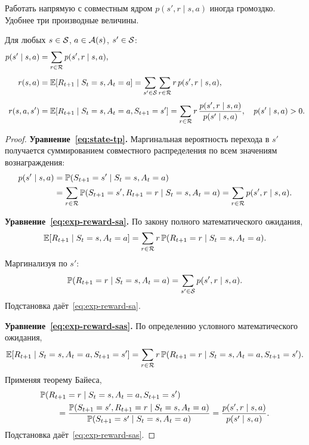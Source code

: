 Работать напрямую с совместным ядром $p(s', r \mid s, a)$ иногда громоздко. Удобнее три производные величины.

\begin{proposition}
\label{prop:derived}
Для любых $s \in \mathcal{S}$, $a \in \mathcal{A}(s)$, $s' \in \mathcal{S}$:
\begin{align}
p(s' \mid s, a) &= \sum_{r \in \mathcal{R}} p(s', r \mid s, a), \label{eq:state-tp} \\[4pt]
r(s, a) &= \operatorname{\mathbb{E}}[R_{t+1} \mid S_t = s, A_t = a]
           = \sum_{s' \in \mathcal{S}} \sum_{r \in \mathcal{R}} r\, p(s', r \mid s, a), \label{eq:exp-reward-sa} \\[4pt]
r(s, a, s') &= \operatorname{\mathbb{E}}[R_{t+1} \mid S_t = s, A_t = a, S_{t+1} = s']
              = \sum_{r \in \mathcal{R}} r\, \frac{p(s', r \mid s, a)}{p(s' \mid s, a)},
              \quad p(s' \mid s, a) > 0. \label{eq:exp-reward-sas}
\end{align}
\end{proposition}

\begin{proof}
\textbf{Уравнение~\eqref{eq:state-tp}.} Маргинальная вероятность перехода в $s'$ получается суммированием совместного распределения по всем значениям вознаграждения:
\begin{align*}
p(s' \mid s, a)
&= \mathbb{P}(S_{t+1} = s' \mid S_t = s, A_t = a)\\
&= \sum_{r \in \mathcal{R}} \mathbb{P}(S_{t+1} = s', R_{t+1} = r \mid S_t = s, A_t = a)
= \sum_{r \in \mathcal{R}} p(s', r \mid s, a).
\end{align*}

\textbf{Уравнение~\eqref{eq:exp-reward-sa}.} По закону полного математического ожидания,
\[
\operatorname{\mathbb{E}}[R_{t+1} \mid S_t = s, A_t = a]
= \sum_{r \in \mathcal{R}} r\, \mathbb{P}(R_{t+1} = r \mid S_t = s, A_t = a).
\]
Маргинализуя по $s'$:
\[
\mathbb{P}(R_{t+1} = r \mid S_t = s, A_t = a)
= \sum_{s' \in \mathcal{S}} p(s', r \mid s, a).
\]
Подстановка даёт~\eqref{eq:exp-reward-sa}.

\textbf{Уравнение~\eqref{eq:exp-reward-sas}.} По определению условного математического ожидания,
\[
\operatorname{\mathbb{E}}[R_{t+1} \mid S_t = s, A_t = a, S_{t+1} = s']
= \sum_{r \in \mathcal{R}} r\, \mathbb{P}(R_{t+1} = r \mid S_t = s, A_t = a, S_{t+1} = s').
\]
Применяя теорему Байеса,
\begin{align*}
&\mathbb{P}(R_{t+1} = r \mid S_t = s, A_t = a, S_{t+1} = s')\\
&\qquad= \frac{\mathbb{P}(S_{t+1} = s', R_{t+1} = r \mid S_t = s, A_t = a)}{\mathbb{P}(S_{t+1} = s' \mid S_t = s, A_t = a)}
= \frac{p(s', r \mid s, a)}{p(s' \mid s, a)}.
\end{align*}
Подстановка даёт~\eqref{eq:exp-reward-sas}.
\end{proof}


